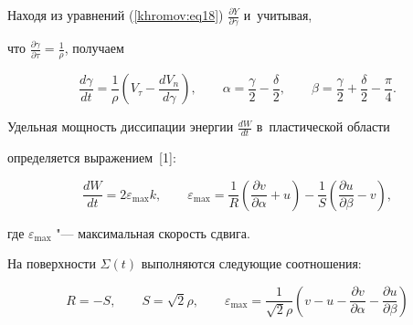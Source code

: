 Находя из уравнений (\ref{khromov:eq18}) $\frac{\partial Y}{\partial \gamma }$ и~учитывая, 

что $\frac{\partial \gamma }{\partial \tau } = \frac{1}{\rho }$, получаем

\begin{equation}

\label{khromov:eq26}

\frac{d\gamma }{dt} = \frac{1}{\rho }\left( {V_\tau - \frac{dV_n }{d\gamma 

}} \right),\qquad \alpha = \frac{\gamma }{2} - \frac{\delta }{2},\qquad \beta 

= \frac{\gamma }{2} + \frac{\delta }{2} - \frac{\pi }{4}.

\end{equation}



Удельная мощность диссипации энергии $\frac{dW}{dt}$ в~пластической области 

определяется выражением~[1]:

\begin{equation}

\label{khromov:eq27}

\frac{dW}{dt} = 2\varepsilon _{\max} k,\qquad 

\varepsilon _{\max} = \frac{1}{R}\left( {\frac{\partial v}{\partial \alpha } + u} \right) - 

\frac{1}{S}\left( {\frac{\partial u}{\partial \beta } - v} \right),

\end{equation}

где $\varepsilon _{\max} $ "--- максимальная скорость сдвига.



На поверхности $\Sigma \left( t \right)$ выполняются следующие соотношения:



\vspace{-2mm}

\begin{equation}

\label{khromov:eq28}

R = - S,\qquad S = \sqrt 2 \rho ,\qquad \varepsilon _{\max} = \frac{1}{\sqrt 2 

\rho }\left( {v - u - \frac{\partial v}{\partial \alpha } - \frac{\partial 

u}{\partial \beta }} \right)

\end{equation}

